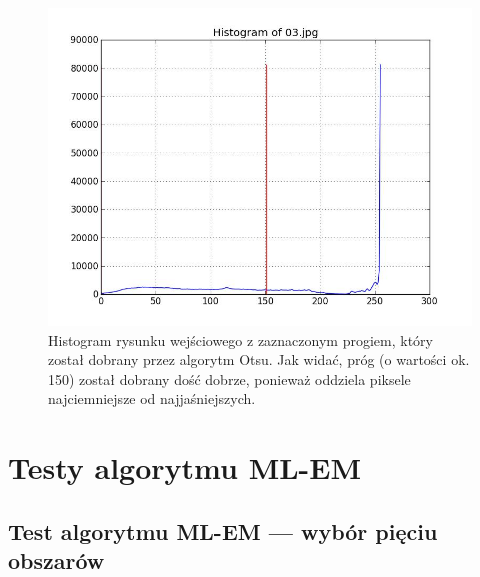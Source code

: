 \documentclass[10pt]{llncs}
\begin{document}
\begin{figure}[h!]
  \centering
  \includegraphics[scale=.3, clip]{img/04_histogram.jpg}
	\caption[]
  {Histogram rysunku wejściowego z zaznaczonym progiem, który został dobrany przez algorytm Otsu. Jak widać, próg (o wartości ok. 150) został dobrany dość dobrze, ponieważ oddziela piksele najciemniejsze od najjaśniejszych.}
\end{figure}

\section{Testy algorytmu ML-EM}

\subsection{Test algorytmu ML-EM --- wybór pięciu obszarów}
\end{document}
